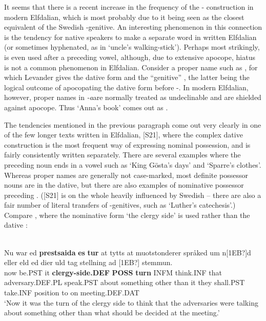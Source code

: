 
It seems that there is a recent increase in the frequency of the \nobreakdash- construction in modern Elfdalian, which is most probably due to it being seen as the closest equivalent of the Swedish -genitive. An interesting phenomenon in this connection is the tendency for native speakers to make  a separate word in written Elfdalian (or sometimes hyphenated, as in  ‘uncle’s walking-stick’). Perhaps most strikingly,  is even used after a preceding vowel, although, due to extensive apocope, hiatus is not a common phenomenon in Elfdalian. Consider a proper name such as , for which Levander gives the dative form  and the “genitive” , the latter being the logical outcome of apocopating the dative form before {}-. In modern Elfdalian, however, proper names in\textit{ {}-a}\textstyleLinguisticExample{ }are normally treated as undeclinable and are shielded against apocope. Thus ‘Anna’s book’ comes out as . 

The tendencies mentioned in the previous paragraph come out very clearly in one of the few longer texts written in Elfdalian, [S21], where the complex dative construction is the most frequent way of expressing nominal possession, and  is fairly consistently written separately. There are several examples where the preceding noun ends in a vowel such as  ‘King Gösta’s days’ and  ‘Sparre’s clothes’. Whereas proper names are generally not case-marked, most definite possessor nouns are in the dative, but there are also examples of nominative possessor preceding . ([S21] is on the whole heavily influenced by Swedish – there are also a fair number of literal transfers of -genitives, such as ‘Luther’s catechesis’.) Compare , where the nominative form  ‘the clergy side’ is used rather than the dative :

\ea\label{}
\\
\gll Nu  war  ed  \textbf{prestsaida} \textbf{es} \textbf{tur} at  tytts at  muotstonderer  språked  um  n[1EB?]d  eller  eld  ed dier  uld  tag  stellning  ad  [1EB?]  stemmun.\\
now  be.PST  it  \textbf{clergy-side.DEF} \textbf{POSS} \textbf{turn} INFM  think.INF that  adversary.DEF.PL  speak.PST  about  something  other  than  it they  shall.PST  take.INF  position  to  on  meeting.DEF.DAT\\
\glt ‘Now it was the turn of the clergy side to think that the adversaries were talking about something other than what should be decided at the meeting.’ 
\z

